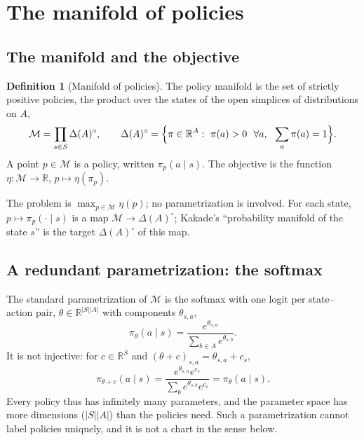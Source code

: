 \documentclass[11pt,a4paper]{article}
\numberwithin{equation}{section}
\theoremstyle{plain}
\theoremstyle{definition}
\newtheorem{definition}[theorem]{Definition}
\theoremstyle{remark}
\newcommand{\R}{\mathbb{R}}
\newcommand{\mani}{\mathcal{M}}
\begin{document}
\section{The manifold of policies}\label{sec:manifold}

\subsection{The manifold and the objective}

\begin{definition}[Manifold of policies]\label{def:manifold}
The policy manifold is the set of strictly positive policies, the product over the states of the open simplices
of distributions on $A$,
\[
  \mani=\prod_{s\in S}\Delta(A)^{\circ},
  \qquad
  \Delta(A)^{\circ}=\Bigl\{\pi\in\R^{A}:\ \pi(a)>0\ \ \forall a,\ \ \sum_a\pi(a)=1\Bigr\}.
\]
A point $p\in\mani$ is a policy, written $\pi_p(a\mid s)$. The objective is the function
$\eta:\mani\to\R$, $p\mapsto\eta(\pi_p)$.
\end{definition}

The problem is $\max_{p\in\mani}\eta(p)$; no parametrization is involved. For each state, $p\mapsto\pi_p(\cdot\mid s)$
is a map $\mani\to\Delta(A)^\circ$; Kakade's ``probability manifold of the state $s$'' is the target $\Delta(A)^\circ$ of this map.

\subsection{A redundant parametrization: the softmax}

The standard parametrization of $\mani$ is the softmax with one logit per state--action pair,
$\theta\in\R^{|S||A|}$ with components $\theta_{s,a}$,
\begin{equation}\label{eq:softmax}
  \pi_\theta(a\mid s)=\frac{e^{\theta_{s,a}}}{\sum_{b\in A}e^{\theta_{s,b}}} .
\end{equation}
It is not injective: for $c\in\R^{S}$ and $(\theta+c)_{s,a}=\theta_{s,a}+c_s$,
\begin{equation}\label{eq:softmax-invariance}
  \pi_{\theta+c}(a\mid s)=\frac{e^{\theta_{s,a}}e^{c_s}}{\sum_{b}e^{\theta_{s,b}}e^{c_s}}=\pi_\theta(a\mid s).
\end{equation}
Every policy thus has infinitely many parameters, and the parameter space has more dimensions ($|S||A|$) than the
policies need. Such a parametrization cannot label policies uniquely, and it is not a chart in the sense below.
\end{document}
